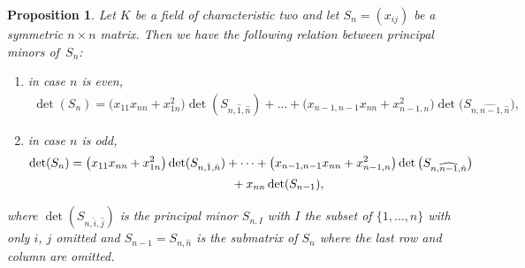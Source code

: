 \documentclass[10pt,a4paper]{amsart}
\numberwithin{equation}{section}
\newtheorem{Proposition}[Theorem]{Proposition}
{ \theoremstyle{definition}
\newtheorem{Definition}[Theorem]{Definition}
\newtheorem{Example}[Theorem]{Example}
\newtheorem{Examples}[Theorem]{Examples}
\newtheorem{Remark}[Theorem]{Remark} }
\begin{document}
\begin{Proposition}\label{prop} Let $K$ be a field of characteristic two and let $S_n=(x_{ij})$ be a symmetric $n\times n$ matrix. Then we have the following relation between
principal minors of~$S_n$:
\begin{enumerate}\itemsep=0pt
 \item[$(1)$] in case $n$ is even, %
\begin{gather*}
\det(S_n) = \big(x_{11}x_{nn}+x_{1n}^2\big)\det(S_{n,\hat{1},\hat{n}})+\dots+\big(x_{n-1,n-1}x_{nn}+x_{n-1,n}^2\big)\det\big(S_{n,\widehat{n-1},\hat{n}}\big),
\end{gather*}
\item[$(2)$] in case $n$ is odd, %
\begin{gather*}
\det(S_n) = \big(x_{11}x_{nn}+x_{1n}^2\big)\det(S_{n,\hat{1},\hat{n}})+\dots +\big(x_{n-1,n-1}x_{nn}+x_{n-1,n}^2\big)\det\big(S_{n,\widehat{n-1},\hat{n}}\big)\\
\hphantom{\det(S_n) =}{} + x_{nn}\det(S_{n-1}),
\end{gather*}
\end{enumerate}
where $\det(S_{n,\hat{i},\hat{j}})$ is the principal minor $S_{n,I}$ with $I$ the subset of $\{1,\ldots,n\}$ with only $i$, $j$ omitted and $S_{n-1}=S_{n,\hat{n}}$ is the submatrix of $S_n$ where the last row and column are omitted.
\end{Proposition}
\end{document}
